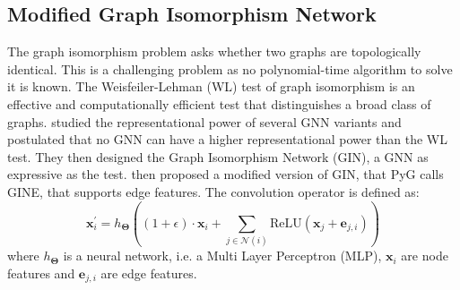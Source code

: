 \documentclass[journal]{IEEEtran}
\begin{document}
\subsection{Modified Graph Isomorphism Network}
\label{sec:gine}
The graph isomorphism problem asks whether two graphs are topologically identical. This is a challenging problem as no polynomial-time algorithm to solve it is known.
The Weisfeiler-Lehman (WL) \cite{weisfeiler1968wl} test of graph isomorphism is an effective and computationally efficient test that distinguishes a broad class of graphs.
\citet{xu2018gin} studied the representational power of several GNN variants and postulated that no GNN can have a higher representational power than the WL test.
They then designed the Graph Isomorphism Network (GIN), a GNN as expressive as the test.
\cite{hu2019gine} then proposed a modified version of GIN, that PyG calls GINE, that supports edge features.
The convolution operator is defined as:
\begin{equation}
    \mathbf{x}^{\prime}_i = h_{\mathbf{\Theta}} \left( (1 + \epsilon) \cdot \mathbf{x}_i + \sum_{j \in \mathcal{N}(i)} \mathrm{ReLU} ( \mathbf{x}_j + \mathbf{e}_{j,i} ) \right)
\end{equation}
where $h_{\mathbf{\Theta}}$ is a neural network, i.e. a Multi Layer Perceptron (MLP), $\mathbf{x}_i$ are node features and $\mathbf{e}_{j,i}$ are edge features.
\end{document}
